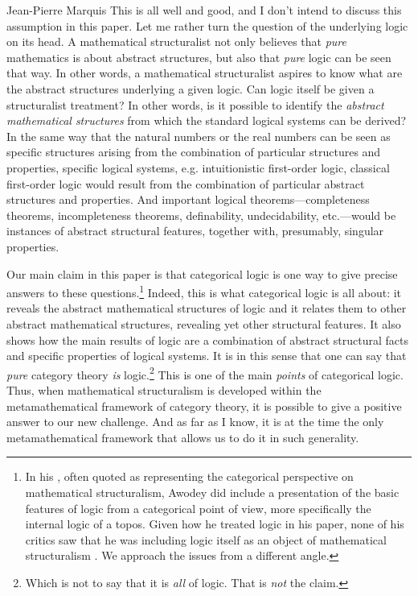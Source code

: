 \begin{artengenv}{Jean-Pierre Marquis}
This is all well and good, and I don't intend to discuss this assumption in this paper. Let me rather turn the question of the underlying logic on its head. A mathematical structuralist not only believes that \emph{pure} mathematics is about abstract structures, but also that \emph{pure} logic can be seen that way. In other words, a mathematical structuralist aspires to know what are the abstract structures underlying a given logic. Can logic itself  be given a structuralist treatment? In other words, is it possible to identify the \emph{abstract mathematical structures} from which the standard logical systems can be derived? In the same way that the natural numbers or the real numbers can be seen as specific structures arising from the combination of particular structures and properties, specific logical systems, e.g. intuitionistic first-order logic, classical first-order logic would result from the combination of particular abstract structures and properties. And important logical theorems---completeness theorems, incompleteness theorems, definability, undecidability, etc.---would be instances of abstract structural features, together with, presumably, singular properties. 

Our main claim in this paper is that categorical logic is one way to give precise answers to these questions.\footnote{In his \parencite*{Awodey1996}, often quoted as representing the categorical perspective on mathematical structuralism, Awodey did include a presentation of the basic features of logic from a categorical point of view, more specifically the internal logic of a topos. Given how he treated logic in his paper, none of his critics saw that he was including logic itself as an object of mathematical structuralism  \parencite[see, for instance,][]{Hellman2001,Hellman2003}. We approach the issues from a different angle.} Indeed, this is what categorical logic is all about: it reveals the abstract mathematical structures of logic and it relates them to other abstract mathematical structures, revealing yet other structural features. It also shows how the main results of logic are a combination of abstract structural facts and specific properties of logical systems. It is in this sense that one can say that \emph{pure} category theory \emph{is} logic.\footnote{Which is not to say that it is \emph{all} of logic. That is \emph{not} the claim.} This is one of the main \emph{points} of categorical logic. Thus, when mathematical structuralism is developed within the metamathematical framework of category theory, it is possible to give a positive answer to our new challenge. And as far as I know, it is at the time the only metamathematical framework that allows us to do it in such generality.


\end{artengenv}
